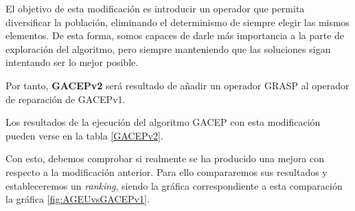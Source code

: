 El objetivo de esta modificación es introducir un operador que permita diversificar la población, eliminando el determinismo de siempre elegir las mismos elementos. 
De esta forma, somos capaces de darle más importancia a la parte de exploración del algoritmo, pero siempre manteniendo que las soluciones sigan intentando ser lo mejor posible. 

Por tanto, \textbf{GACEPv2} será resultado de añadir un operador GRASP al operador de reparación de GACEPv1.

Los resultados de la ejecución del algoritmo GACEP con esta modificación pueden verse en la tabla \ref{GACEPv2}. 

Con esto, debemos comprobar si realmente se ha producido una mejora con respecto a la modificación anterior. 
Para ello compararemos sus resultados y estableceremos un \textit{ranking}, siendo la gráfica correspondiente a esta comparación la gráfica \ref{fig:AGEUvsGACEPv1}. 


